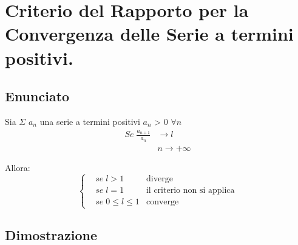 \documentclass[../dimostrazioni]{subfiles}
\begin{document}
    \chapter{Criterio del Rapporto per la Convergenza delle Serie a termini positivi.}
    \label{criterioRapportoSerie}

        \section*{Enunciato}

            Sia \(\Sigma\) \(a_n\) una serie a termini positivi \(a_n\) > 0 \(\forall n\)
            \begin{align*}
                Se \; \frac{a_{n+1}}{a_n} &\longrightarrow l \\
                &n  \rightarrow +\infty
            \end{align*}
            
            Allora:
            \[
                \left\{
                    \begin{aligned}
                        &se \; l > 1 & \text{diverge} \\
                        &se \; l = 1 & \text{il criterio non si applica} \\
                        &se \; 0 \leqslant l \leqslant 1 & \text{converge}
                    \end{aligned}
                \right.
            \]
            
        \section*{Dimostrazione}
\end{document}
